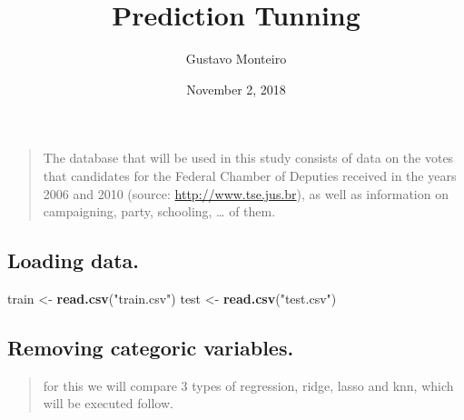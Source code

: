 \documentclass[]{article}
\title{Prediction Tunning}
\author{Gustavo Monteiro}
\date{November 2, 2018}
\newenvironment{Shaded}{\begin{snugshade}}{\end{snugshade}}
\newcommand{\KeywordTok}[1]{\textcolor[rgb]{0.13,0.29,0.53}{\textbf{#1}}}
\newcommand{\StringTok}[1]{\textcolor[rgb]{0.31,0.60,0.02}{#1}}
\newcommand{\OperatorTok}[1]{\textcolor[rgb]{0.81,0.36,0.00}{\textbf{#1}}}
\newcommand{\NormalTok}[1]{#1}
\begin{document}
\maketitle

{
\setcounter{tocdepth}{2}
\tableofcontents
}
\begin{quote}
The database that will be used in this study consists of data on the
votes that candidates for the Federal Chamber of Deputies received in
the years 2006 and 2010 (source: \url{http://www.tse.jus.br}), as well
as information on campaigning, party, schooling, \ldots{} of them.
\end{quote}

\subsection{Loading data.}\label{loading-data.}

\begin{Shaded}
\begin{Highlighting}[]
\NormalTok{train <-}\StringTok{ }\KeywordTok{read.csv}\NormalTok{(}\StringTok{"train.csv"}\NormalTok{)}
\NormalTok{test <-}\StringTok{ }\KeywordTok{read.csv}\NormalTok{(}\StringTok{"test.csv"}\NormalTok{)}
\end{Highlighting}
\end{Shaded}

\subsection{Removing categoric
variables.}\label{removing-categoric-variables.}

\begin{Shaded}
\end{Shaded}

\begin{quote}
for this we will compare 3 types of regression, ridge, lasso and knn,
which will be executed follow.
\end{quote}
\end{document}
